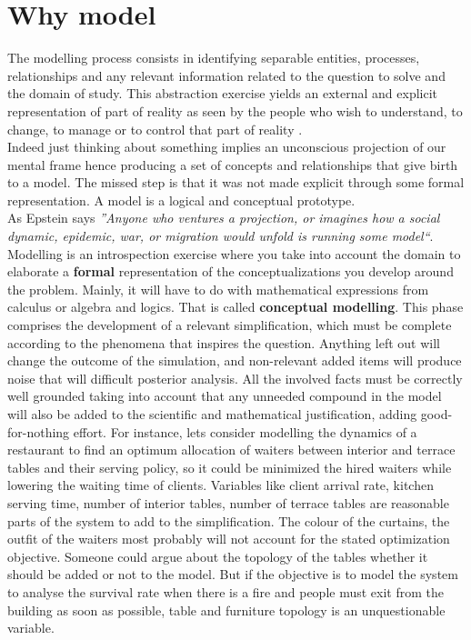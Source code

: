 \documentclass[11pt,oneside,a4paper,openright]{report}
\begin{document}
\section{Why model}
%
The modelling process consists in identifying separable entities, processes, relationships and any relevant information related to the question to solve and the domain of study. 
This abstraction exercise yields an external and explicit representation of part of reality as seen by the
people who wish to understand, to change, to manage or to control that part of reality \cite{Pidd2003}.\\
Indeed just thinking about something implies an unconscious projection of our mental frame hence producing a set of concepts and relationships that give birth to a model. The missed step is that it was not made explicit through some formal representation. A model is a logical and conceptual prototype.\\
As Epstein \cite[p.1]{Epstein2008} says \textit{''Anyone who ventures a projection, or imagines how a social dynamic, epidemic, war, or migration would unfold is running some model``}.\\
Modelling is an introspection exercise where you take into account the domain to elaborate a \textbf{formal} representation of the conceptualizations you develop around the problem. Mainly, it will have to do with mathematical expressions from calculus or algebra and logics. That is called \textbf{conceptual modelling}. This phase comprises the development of a relevant simplification, which must be complete according to the phenomena that inspires the question. Anything left out will change the outcome of the simulation, and non-relevant added items will produce noise that will difficult posterior analysis. All the involved facts must be correctly well grounded taking into account that any unneeded compound in the model will also be added to the scientific and mathematical justification, adding good-for-nothing effort.
For instance, lets consider modelling the dynamics of a restaurant to find an optimum allocation of waiters between interior and terrace tables and their serving policy, so it could be minimized the hired waiters while lowering the waiting time of clients. Variables like client arrival rate, kitchen serving time, number of interior tables, number of terrace tables are reasonable parts of the system to add to the simplification. The colour of the curtains, the outfit of the waiters most probably will not account for the stated optimization objective. Someone could argue about the topology of the tables whether it should be added or not to the model. But if the objective is to model the system to analyse the survival rate when there is a fire and people must exit from the building as soon as possible, table and furniture topology is an unquestionable variable.\\
\end{document}
